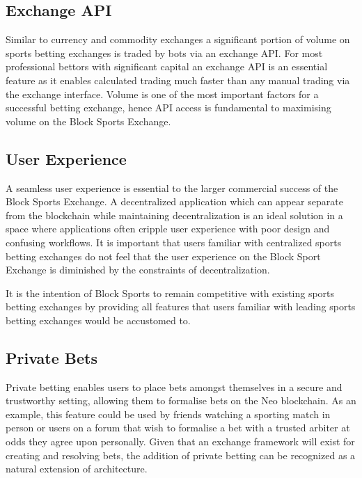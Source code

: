 \documentclass{article}
\begin{document}
	\subsection{Exchange API}
Similar to currency and commodity exchanges a significant portion of volume on sports betting exchanges is traded by bots via an exchange API. For most professional bettors with significant capital an exchange API is an essential feature as it enables calculated trading much faster than any manual trading via the exchange interface. Volume is one of the most important factors for a successful betting exchange, hence API access is fundamental to maximising volume on the Block Sports Exchange.	

	\subsection{User Experience}
A seamless user experience is essential to the larger commercial success of the Block Sports Exchange. A decentralized application which can appear separate from the blockchain while maintaining decentralization is an ideal solution in a space where applications often cripple user experience with poor design and confusing workflows. It is important that users familiar with centralized sports betting exchanges do not feel that the user experience on the Block Sport Exchange is diminished by the constraints of decentralization. 

It is the intention of Block Sports to remain competitive with existing sports betting exchanges by providing all features that users familiar with leading sports betting exchanges would be accustomed to.

	\subsection{Private Bets}
Private betting enables users to place bets amongst themselves in a secure and trustworthy setting, allowing them to formalise bets on the Neo blockchain. As an example, this feature could be used by friends watching a sporting match in person or users on a forum that wish to formalise a bet with a trusted arbiter at odds they agree upon personally. Given that an exchange framework will exist for creating and resolving bets, the addition of private betting can be recognized as a natural extension of architecture.
\end{document}
